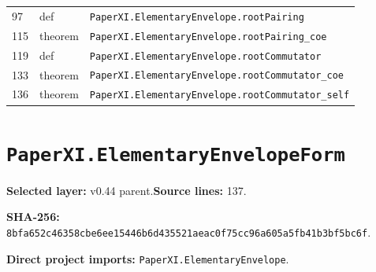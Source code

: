 \documentclass[10pt,oneside]{book}
\begin{document}
\begin{longtable}{@{}p{}p{}p{}@{}}
97&def&\nolinkurl{PaperXI.ElementaryEnvelope.rootPairing}\\

115&theorem&\nolinkurl{PaperXI.ElementaryEnvelope.rootPairing_coe}\\

119&def&\nolinkurl{PaperXI.ElementaryEnvelope.rootCommutator}\\

133&theorem&\nolinkurl{PaperXI.ElementaryEnvelope.rootCommutator_coe}\\

136&theorem&\nolinkurl{PaperXI.ElementaryEnvelope.rootCommutator_self}\\

\bottomrule\end{longtable}

\section{\texorpdfstring{\nolinkurl{PaperXI.ElementaryEnvelopeForm}}{PaperXI.ElementaryEnvelopeForm}}\label{module:PaperXI.ElementaryEnvelopeForm}

\textbf{Selected layer:} v0.44 parent.\quad\textbf{Source lines:} 137.\par\textbf{SHA-256:} {\scriptsize\nolinkurl{8bfa652c46358cbe6ee15446b6d435521aeac0f75cc96a605a5fb41b3bf5bc6f}}.


\textbf{Direct project imports:} \nolinkurl{PaperXI.ElementaryEnvelope}.
\end{document}

